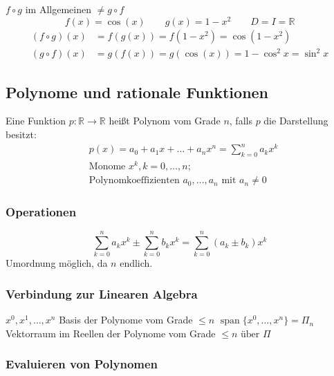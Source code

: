\begin{note} \(f \circ g \) im Allgemeinen \( \neq g \circ f \)
	\[
			f(x) = \cos(x)\qquad g(x) = 1-x^2 \qquad D = I=\mathbb{R}
	\]
		\begin{align*}
		(f \circ g)(x) &= f(g(x)) = f(1-x^2) = \cos(1-x^2) \\
		(g \circ f)(x) &= g(f(x)) = g(\cos(x)) = 1-\cos^2x = \sin^2x 
	\end{align*}	
\end{note}


\subsection{Polynome und rationale Funktionen} %
\label{sub:polyFunk}

Eine Funktion \( p:\mathbb{R} \rightarrow \mathbb{R} \) heißt Polynom vom Grade $n$, falls $p$ die Darstellung besitzt:
\begin{align*}
	&p(x)=a_0+a_1x+\ldots+a_n x^n = \sum_{k=0}^{n} a_kx^k\\
	&\text{Monome }x^k, k=0,\ldots,n; \\
	&\text{Polynomkoeffizienten }a_0,\ldots,a_n \text{ mit } a_n \neq 0
\end{align*}

\subsubsection*{Operationen} %
\label{ssub:polyOp}

\[
  \sum_{k=0}^{n}  a_kx^k  \pm
  \sum_{k=0}^{n}  b_kx^k  =
  \sum_{k=0}^{n}  (a_k \pm b_k)x^k 
\]
Umordnung möglich, da \( n \) endlich.

\subsubsection*{Verbindung zur Linearen Algebra} %
\label{ssub:polyLinAlg}
\( x^0,x^1,\ldots,x^n \) Basis der Polynome vom Grade \( \leq n \) \newline
\( \operatorname{span} \{x^0 ,\ldots,x^n\}=\Pi_n \) Vektorraum im Reellen der Polynome vom Grade \( \leq n \text{ über } \Pi \)


\subsubsection*{Evaluieren von Polynomen} %
\label{ssub:evaluieren_von_polynomen}

